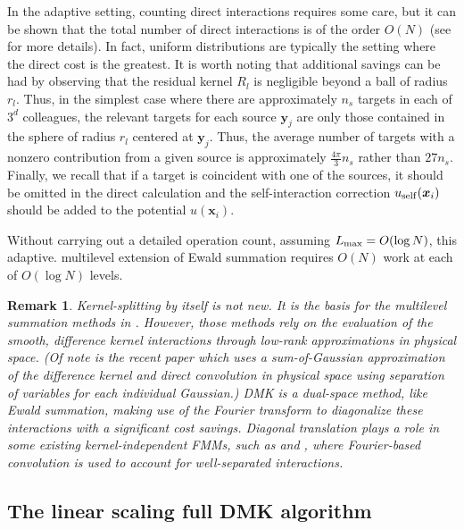 \documentclass[final,letterpaper]{siamart171218}
\newtheorem{remark}[theorem]{Remark}
\newcommand{\x}{\boldsymbol{x}}
\newcommand{\y}{\boldsymbol{y}}
\newcommand{\acron}{DMK }
\newcommand{\cR}{r}
\begin{document}
In the adaptive setting, counting direct interactions requires
some care, but it can be shown that the total number of direct interactions
is of the order $O(N)$ 
(see \cite{carrier1988sisc,nabors1994sisc} for more details).
In fact, uniform distributions are typically 
the setting where the direct cost is the greatest.
It is worth noting that
additional savings can be had by observing that 
the residual kernel $R_l$ is negligible beyond a ball of radius $\cR_l$. 
Thus, in the simplest case where there are approximately $n_s$ 
targets in each of $3^d$ colleagues, the relevant targets for
each source $\y_j$ are only those contained in the sphere of radius $\cR_l$
centered at $\y_j$.
Thus, the average number of targets
with a nonzero contribution from a given source is approximately
$\frac{4\pi}{3} n_s$ rather than $27n_s$.
Finally, we recall that if a target is coincident with one of the sources,
it should be omitted in the direct calculation and the 
self-interaction correction
$u_{\rm self}(\x_i)$ should be added to the potential $u(\x_i)$.

Without carrying out a detailed operation count, assuming $L_{\rm max} = O(\log N)$,
this adaptive. multilevel extension of Ewald summation requires 
$O(N)$ work at each of $O(\log N)$ levels. 

\begin{remark} \label{kersplit}
Kernel-splitting by itself is not new. It is the basis for the multilevel
summation methods in  
\cite{brandt1990jcp,brandt1998,hardy2009pc,multilevel_summation_2015,
multilevel_summation_bspline,skeel2002}.
However, those methods rely
on the evaluation of the smooth, difference kernel interactions 
through low-rank approximations  in physical space.
(Of note is the recent paper 
\cite{tensor_multilevel_ewald} which uses a sum-of-Gaussian approximation of the 
difference kernel and direct convolution in physical space using
separation of variables for each individual Gaussian.) 
\acron is a {\em dual-space} method, like Ewald summation, making use of the 
Fourier transform to diagonalize these
interactions with a significant cost savings.
Diagonal translation plays a role
in some existing kernel-independent FMMs, such as \cite{fmm7}
and \cite{zhang2011jcp}, where Fourier-based convolution is used to account for
well-separated interactions.
\end{remark}

\subsection{The linear scaling full \acron algorithm}
\label{sec:afemmodifications}
\end{document}
